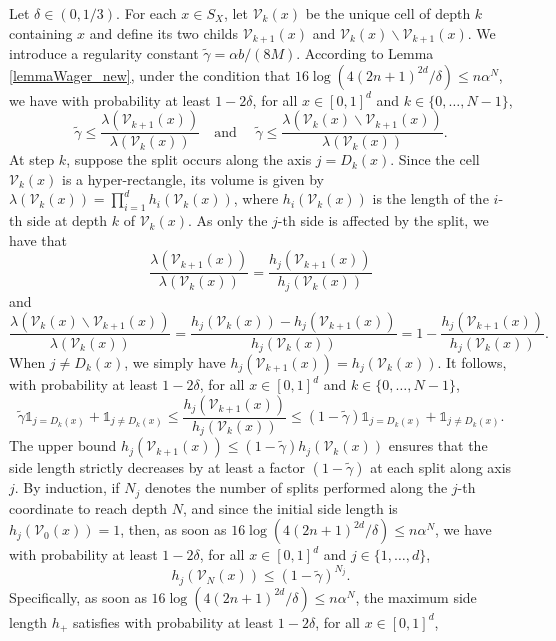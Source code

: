 \documentclass[paper=a4, fontsize=11pt]{scrartcl}
\begin{document}
Let $\delta \in (0,1/3)$. For each $x \in S_X$, let $\mathcal{V}_k(x)$ be the unique cell of depth $k$ containing $x$ and define its two childs $\mathcal{V}_{k+1}(x)$ and $\mathcal{V}_k(x) \backslash \mathcal{V}_{k+1}(x)$. We introduce a regularity constant $\tilde{\gamma} = {\alpha b}/{(8M)}$. According to  Lemma \ref{lemmaWager_new}, under the condition that $16 \log( 4 (2n+1)^{2d} / \delta) \leq n \alpha^{N}$, we have with probability at least $1-2\delta$, for all $x\in [0,1]^d $ and $k \in  \{0,\dots,N-1 \}$, 
$$\tilde{\gamma} \leq \dfrac{\lambda(\mathcal{V}_{k+1}(x))}{\lambda(\mathcal{V}_{k}(x))} \quad \text{and } \quad \tilde{\gamma} \leq \dfrac{\lambda(\mathcal{V}_k(x) \backslash \mathcal{V}_{k+1}(x))}{\lambda(\mathcal{V}_{k}(x))}.$$
At step $k$, suppose the split occurs along the axis $j = D_k(x)$. Since the cell $\mathcal{V}_k(x)$ is a hyper-rectangle, its volume is given by $\lambda(\mathcal{V}_k(x)) = \prod_{i=1}^d h_i(\mathcal{V}_k(x))$, where $h_i(\mathcal{V}_k(x))$ is the length of the $i$-th side at depth $k$ of $\mathcal{V}_k(x)$. As only the $j$-th side is affected by the split, we have  that
$$\dfrac{\lambda(\mathcal{V}_{k+1}(x))}{\lambda(\mathcal{V}_{k}(x))} = \frac{h_j(\mathcal{V}_{k+1}(x))}{h_j(\mathcal{V}_k(x))}$$ and $$\dfrac{\lambda(\mathcal{V}_k(x) \backslash \mathcal{V}_{k+1}(x))} {\lambda(\mathcal{V}_{k}(x))} = \frac{h_j(\mathcal{V}_k(x)) - h_j(\mathcal{V}_{k+1}(x))}{h_j(\mathcal{V}_k(x))} = 1 - \frac{h_j(\mathcal{V}_{k+1}(x))}{h_j(\mathcal{V}_k(x))}.$$  
When $j\neq D_k(x)$, we simply have $ h_j(\mathcal{V}_{k+1}(x)) = h_j(\mathcal{V}_k(x))$. It follows, with probability at least $1-2\delta$, for all $x\in [0,1]^d $ and $k \in  \{0,\dots,N-1 \}$, 
$$\tilde{\gamma} \mathds 1_{j=D_k(x)} + \mathds 1_{j\neq D_k(x)}\leq \frac{h_j(\mathcal{V}_{k+1}(x))}{h_j(\mathcal{V}_k(x))} \leq (1 - \tilde{\gamma})\mathds 1_{j=D_k(x)} + \mathds 1_{j\neq D_k(x)}.$$
The upper bound $h_j(\mathcal{V}_{k+1}(x)) \leq (1 - \tilde{\gamma}) h_j(\mathcal{V}_k(x))$ ensures that the side length strictly decreases by at least a factor $(1-\tilde{\gamma})$ at each split along axis $j$. By induction, if $N_j$ denotes the number of splits performed along the $j$-th coordinate to reach depth $N$, and since the initial side length is $h_j(\mathcal{V}_0(x)) =1$, then, as soon as $16\log( 4 (2n+1)^{2d} / \delta) \leq n \alpha^{N}$, we have with probability at least $1-2\delta$, for all $x\in [0,1]^d$ and $j \in \{1,\dots,d\}$, 
$$h_j(\mathcal{V}_N(x)) \leq (1 - \tilde{\gamma})^{N_j}.$$
Specifically, as soon as $16 \log( 4(2n+1)^{2d} / \delta) \leq n \alpha^{N}$, the maximum side length $h_+$ satisfies with probability at least $1-2\delta$,  for all $x\in [0,1]^d$, 
\end{document}
